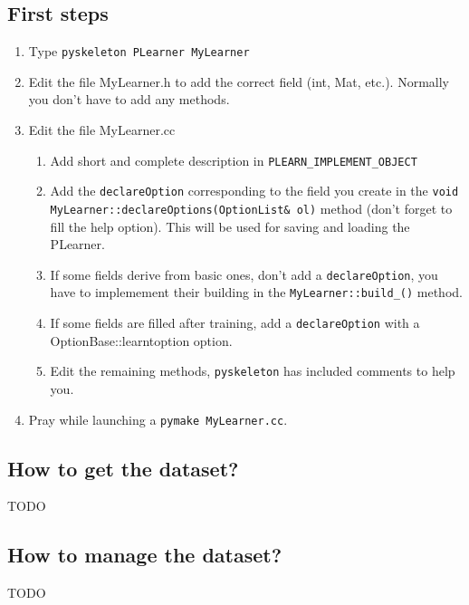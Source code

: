 \documentclass[11pt]{book}
\begin{document}
\subsection{First steps}
\begin{enumerate}

\item Type \texttt{pyskeleton PLearner MyLearner}

\item Edit the file MyLearner.h to add the correct field (int, Mat,
      etc.). Normally you don't have to add any methods.

\item Edit the file MyLearner.cc
  \begin{enumerate}
    \item  Add short and complete description in
    \texttt{PLEARN\_IMPLEMENT\_OBJECT}

    \item  Add the \texttt{declareOption} corresponding
    to the field you create in the \texttt{void
    MyLearner::declareOptions(OptionList\& ol)} method (don't forget
    to fill the help option). This will be used for saving and loading
    the PLearner.

    \item  If some fields derive from basic ones, don't add a
    \texttt{declareOption}, you have to implemement their building
    in the \texttt{MyLearner::build\_()} method.

    \item  If some fields are filled after training, add a
    \texttt{declareOption} with a OptionBase::learntoption option.

    \item  Edit the remaining methods, \texttt{pyskeleton} has included
    comments to help you.
  \end{enumerate}

\item Pray while launching a \texttt{pymake MyLearner.cc}.
\end{enumerate} 


\subsection{How to get the dataset?}
TODO

\subsection{How to manage the dataset?}
TODO
\end{document}

